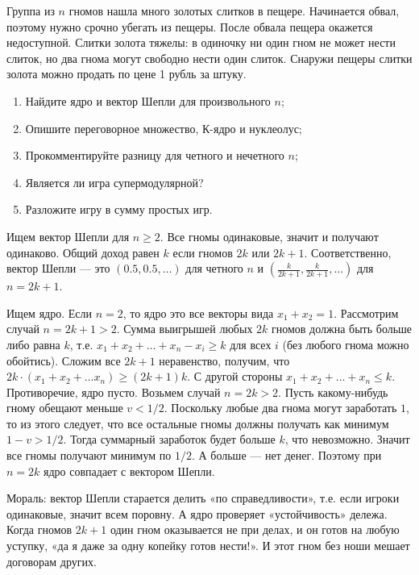 \begin{problem}
 Группа из $n$ гномов нашла много золотых слитков в пещере. Начинается обвал, поэтому нужно срочно убегать из пещеры. После обвала пещера окажется недоступной. Слитки золота тяжелы: в одиночку ни один гном не может нести слиток, но два гнома могут свободно нести один слиток. Снаружи пещеры слитки золота можно продать по цене 1 рубль за штуку.
\begin{enumerate}
\item Найдите ядро и вектор Шепли для произвольного $n$;
\item Опишите переговорное множество, К-ядро и нуклеолус;
\item Прокомментируйте разницу для четного и нечетного $n$;
\item Является ли игра супермодулярной?
\item Разложите игру в сумму простых игр.
\end{enumerate}




\begin{sol}
Ищем вектор Шепли для $n\geq 2$. Все гномы одинаковые, значит и получают одинаково. Общий доход равен $k$ если гномов $2k$ или $2k+1$. Соответственно, вектор Шепли — это $(0.5,0.5,\ldots )$ для четного $n$ и $(\frac{k}{2k+1},\frac{k}{2k+1},\ldots )$ для $n=2k+1$.

Ищем ядро. Если $n=2$, то ядро это все векторы вида $x_{1}+x_{2}=1$. Рассмотрим случай $n=2k+1>2$. Сумма выигрышей любых $2k$ гномов должна быть больше либо равна $k$, т.е. $x_{1}+x_{2}+\ldots +x_{n}-x_{i}\geq k$ для всех $i$ (без любого гнома можно обойтись). Сложим все $2k+1$ неравенство, получим, что $2k\cdot (x_{1}+x_{2}+\ldots x_{n})\geq (2k+1)k$. С другой стороны $x_{1}+x_{2}+\ldots +x_{n}\leq k$. Противоречие, ядро пусто. Возьмем случай $n=2k>2$. Пусть какому-нибудь гному обещают меньше $v<1/2$. Поскольку любые два гнома могут заработать $1$, то из этого следует, что все остальные гномы должны получать как минимум $1-v>1/2$. Тогда суммарный заработок будет больше $k$, что невозможно. Значит все гномы получают минимум по $1/2$. А больше  — нет денег. Поэтому при $n=2k$ ядро совпадает с вектором Шепли.

Мораль: вектор Шепли старается делить «по справедливости», т.е. если игроки одинаковые, значит всем поровну. А ядро проверяет «устойчивость» дележа. Когда гномов $2k+1$ один гном оказывается не при делах, и он готов на любую уступку, «да я даже за одну копейку готов нести!». И этот гном без ноши мешает договорам других.
\end{sol}
\end{problem}


